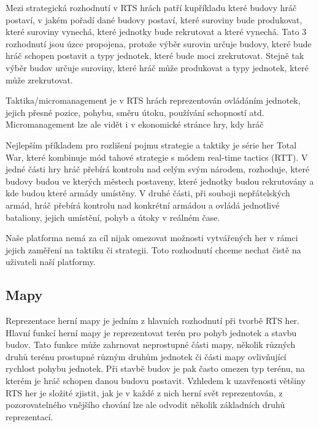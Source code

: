 Mezi strategická rozhodnutí v RTS hrách patří kupříkladu které budovy hráč postaví, v jakém pořadí dané budovy postaví, které suroviny bude produkovat, které suroviny vynechá, které jednotky bude rekrutovat a které vynechá.  Tato 3 rozhodnutí jsou úzce propojena, protože výběr surovin určuje budovy, které bude hráč schopen postavit a typy jednotek, které bude moci zrekrutovat. Stejně tak výběr budov určuje suroviny, které hráč může produkovat a typy jednotek, které může zrekrutovat. 

Taktika/micromanagement je v RTS hrách reprezentován ovládáním jednotek, jejich přesné pozice, pohybu, směru útoku, používání schopností atd. Micromanagement lze ale vidět i v ekonomické stránce hry, kdy hráč 

Nejlepším příkladem pro rozlišení pojmu strategie a taktiky je série her Total War, které kombinuje mód tahové strategie s módem real-time tactics (RTT). V jedné části hry hráč přebírá kontrolu nad celým svým národem, rozhoduje, které budovy budou ve kterých městech postaveny, které jednotky budou rekrutovány a kde budou které armády umístěny. V druhé části, při souboji nepřátelských armád, hráč přebírá kontrolu nad konkrétní armádou a ovládá jednotlivé bataliony, jejich umístění, pohyb a útoky v reálném čase.

Naše platforma nemá za cíl nijak omezovat možnosti vytvářených her v rámci jejich zaměření na taktiku či strategii. Toto rozhodnutí chceme nechat čistě na uživateli naší platformy.

\subsection{Mapy}
\label{sec:mapy}
Reprezentace herní mapy je jedním z hlavních rozhodnutí při tvorbě RTS her. Hlavní funkcí herní mapy je reprezentovat terén pro pohyb jednotek a stavbu budov. 
Tato funkce může zahrnovat neprostupné části mapy, několik různých druhů terénu prostupné různým druhům jednotek či části mapy ovlivňující rychlost pohybu jednotek.
Při stavbě budov je pak často omezen typ terénu, na kterém je hráč schopen danou budovu postavit. 
Vzhledem k uzavřenosti většiny RTS her je složité zjistit, jak je v každé z nich herní svět reprezentován, z pozorovatelného vnějšího chování lze ale odvodit několik základních druhů reprezentací. 

